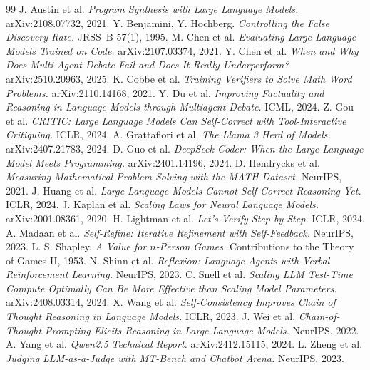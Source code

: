 \documentclass[12pt,a4paper]{article}
\begin{document}
\begin{thebibliography}{99}\small
{} J. Austin et al. \emph{Program Synthesis with Large Language Models.}
arXiv:2108.07732, 2021.
 Y. Benjamini, Y. Hochberg. \emph{Controlling the False Discovery Rate.}
JRSS--B 57(1), 1995.
 M. Chen et al. \emph{Evaluating Large Language Models Trained on Code.}
arXiv:2107.03374, 2021.
 Y. Chen et al. \emph{When and Why Does Multi-Agent Debate Fail and Does It
Really Underperform?} arXiv:2510.20963, 2025.
 K. Cobbe et al. \emph{Training Verifiers to Solve Math Word Problems.}
arXiv:2110.14168, 2021.
 Y. Du et al. \emph{Improving Factuality and Reasoning in Language Models
through Multiagent Debate.} ICML, 2024.
 Z. Gou et al. \emph{CRITIC: Large Language Models Can Self-Correct with
Tool-Interactive Critiquing.} ICLR, 2024.
 A. Grattafiori et al. \emph{The Llama 3 Herd of Models.}
arXiv:2407.21783, 2024.
 D. Guo et al. \emph{DeepSeek-Coder: When the Large Language Model Meets
Programming.} arXiv:2401.14196, 2024.
 D. Hendrycks et al. \emph{Measuring Mathematical Problem Solving with
the MATH Dataset.} NeurIPS, 2021.
 J. Huang et al. \emph{Large Language Models Cannot Self-Correct Reasoning
Yet.} ICLR, 2024.
 J. Kaplan et al. \emph{Scaling Laws for Neural Language Models.}
arXiv:2001.08361, 2020.
 H. Lightman et al. \emph{Let's Verify Step by Step.} ICLR, 2024.
 A. Madaan et al. \emph{Self-Refine: Iterative Refinement with
Self-Feedback.} NeurIPS, 2023.
 L. S. Shapley. \emph{A Value for $n$-Person Games.} Contributions to the
Theory of Games II, 1953.
 N. Shinn et al. \emph{Reflexion: Language Agents with Verbal Reinforcement
Learning.} NeurIPS, 2023.
 C. Snell et al. \emph{Scaling LLM Test-Time Compute Optimally Can Be More
Effective than Scaling Model Parameters.} arXiv:2408.03314, 2024.
 X. Wang et al. \emph{Self-Consistency Improves Chain of Thought Reasoning in
Language Models.} ICLR, 2023.
 J. Wei et al. \emph{Chain-of-Thought Prompting Elicits Reasoning in Large
Language Models.} NeurIPS, 2022.
 A. Yang et al. \emph{Qwen2.5 Technical Report.} arXiv:2412.15115, 2024.
 L. Zheng et al. \emph{Judging LLM-as-a-Judge with MT-Bench and Chatbot
Arena.} NeurIPS, 2023.
\end{thebibliography}
\end{document}
